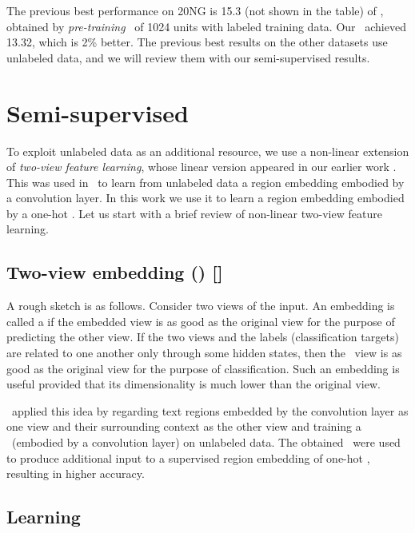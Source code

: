 \documentclass{article}
\begin{document}
The previous best performance on 20NG is 15.3 (not shown in the table) 
of \DLa, obtained by {\em pre-training} 
\wvLstm\ of 1024 units with labeled training data.  
Our \ohBiLstm\ achieved 13.32, which is 2\% better.  
The previous best results on the other datasets use unlabeled data, 
and we will review them with our semi-supervised results. 

\section{Semi-supervised \lstm}
\label{sec:semi}

To exploit unlabeled data as an additional resource, we use a non-linear extension of {\em two-view feature learning}, 
whose linear version appeared in our earlier work \cite{AZ05jmlr,AZ07}.  
This was used in \JZb\ to learn from unlabeled data a region embedding embodied by a convolution layer. 
In this work we use it to learn a region embedding embodied by a one-hot \lstm.   
Let us start with a brief review of non-linear two-view feature learning.   

\subsection{Two-view embedding (\tvEmb) [\JZb]} 
\label{sec:tvemb}
A rough sketch is as follows. 
Consider two views of the input.  
An embedding is called a {\em \tvEmb} if the embedded view is as good as the original view 
for the purpose of predicting the other view.  
If the two views and the labels (classification targets) are related to one another 
only through some hidden states, then the \tvEmbd\ view is as good as the original view 
for the purpose of classification.  Such an embedding is useful provided that its dimensionality is 
much lower than the original view.  

\JZb\ applied this idea by regarding text regions embedded by the convolution layer  
as one view and their surrounding context as the other view and training a \tvEmb\ (embodied by a convolution layer) 
on unlabeled data.  The obtained \tvEmbs\ were used to produce additional input to 
a supervised region embedding of one-hot \cnn,
resulting in higher accuracy.  


\subsection{Learning \lstm\ \tvEmbs} 
\end{document}
